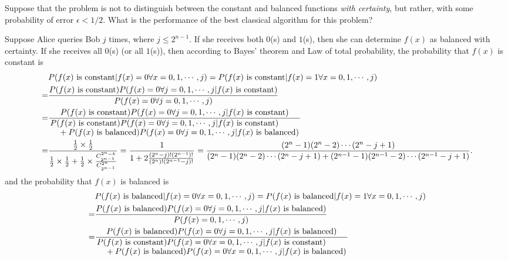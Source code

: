 \documentclass[en]{sol-man}
\begin{document}
\begin{exe}
    Suppose that the problem is not to distinguish between the constant and balanced functions \emph{with certainty}, but rather, with some probability of error $\epsilon<1/2$. What is the performance of the best classical algorithm for this problem?
\end{exe}
\begin{sol}
    Suppose Alice queries Bob $j$ times, where $j\leq 2^{n-1}$. If she receives both $0$(s) and $1$(s), then she can determine $f(x)$ as balanced with certainty. If she receives all $0$(s) (or all $1$(s)), then according to Bayes' theorem and Law of total probability, the probability that $f(x)$ is constant is
    \begin{align}
        \notag&P(f(x)\text{ is constant}\vert f(x)=0\forall x=0,1,\cdots,j)=P(f(x)\text{ is constant}\vert f(x)=1\forall x=0,1,\cdots,j)\\
        \notag=&\frac{P(f(x)\text{ is constant})P(f(x)=0\forall j=0,1,\cdots,j\vert f(x)\text{ is constant})}{P(f(x)=0\forall j=0,1,\cdots,j)}\\
        \notag=&\frac{P(f(x)\text{ is constant})P(f(x)=0\forall j=0,1,\cdots,j\vert f(x)\text{ is constant})}{\splitfrac{P(f(x)\text{ is constant})P(f(x)=0\forall j=0,1,\cdots,j\vert f(x)\text{ is constant})}{+P(f(x)\text{ is balanced})P(f(x)=0\forall j=0,1,\cdots,j\vert f(x)\text{ is balanced})}}\\
        =&\frac{\frac{1}{2}\times\frac{1}{2}}{\frac{1}{2}\times\frac{1}{2}+\frac{1}{2}\times\frac{C^{2^n-k}_{2^{n-1}}}{C^{2^n}_{2^{n-1}}}}=\frac{1}{1+2\frac{(2^n-j)!(2^{n-1})!}{(2^n)!(2^{n-1}-j)!}}=\frac{(2^n-1)(2^n-2)\cdots(2^n-j+1)}{(2^n-1)(2^n-2)\cdots(2^n-j+1)+(2^{n-1}-1)(2^{n-1}-2)\cdots(2^{n-1}-j+1)}.
    \end{align}
    and the probability that $f(x)$ is balanced is
    \begin{align}
        \notag&P(f(x)\text{ is balanced}\vert f(x)=0\forall x=0,1,\cdots,j)=P(f(x)\text{ is balanced}\vert f(x)=1\forall x=0,1,\cdots,j)\\
        \notag=&\frac{P(f(x)\text{ is balanced})P(f(x)=0\forall j=0,1,\cdots,j\vert f(x)\text{ is balanced})}{P(f(x)=0,1,\cdots,j)}\\
        \notag=&\frac{P(f(x)\text{ is balanced})P(f(x)=0\forall j=0,1,\cdots,j\vert f(x)\text{ is balanced})}{\splitfrac{P(f(x)\text{ is constant})P(f(x)=0\forall x=0,1,\cdots,j\vert f(x)\text{ is constant})}{+P(f(x)\text{ is balanced})P(f(x)=0\forall x=0,1,\cdots,j\vert f(x)\text{ is balanced})}}\\

\end{align}
\end{sol}
\end{document}
